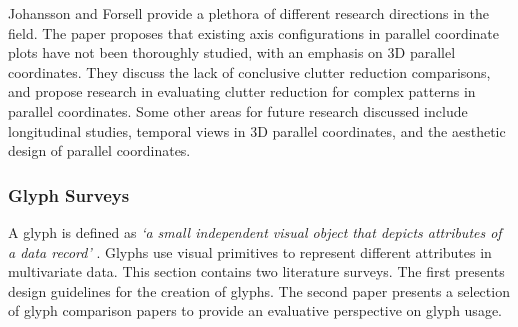 %
%

Johansson and Forsell provide a plethora of different research directions in the field. The paper proposes that existing axis configurations in parallel coordinate plots have not been thoroughly studied, with an emphasis on 3D parallel coordinates. They discuss the lack of conclusive clutter reduction comparisons, and propose research in evaluating clutter reduction for complex patterns in parallel coordinates. Some other areas for future research discussed include longitudinal studies, temporal views in 3D parallel coordinates, and the aesthetic design of parallel coordinates.


\subsubsection{Glyph Surveys}
A glyph is defined as  \textit{`a small independent visual object that depicts attributes of a data record'} \cite{borgo2013glyph}. Glyphs use visual primitives to represent different attributes in multivariate data. This section contains two literature surveys. The first presents design guidelines for the creation of glyphs. The second paper presents a selection of glyph comparison papers to provide an evaluative perspective on glyph usage.


